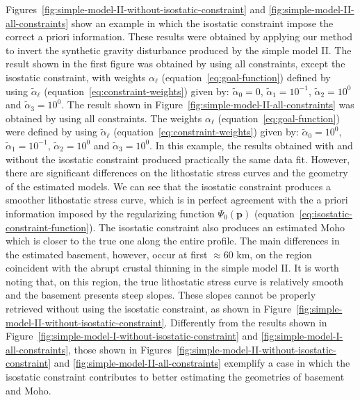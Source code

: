 \documentclass[manuscript]{geophysics}
\begin{document}
Figures~\ref{fig:simple-model-II-without-isostatic-constraint} and 
\ref{fig:simple-model-II-all-constraints}
show an example in which the isostatic constraint impose the correct
a priori information. 
These results were obtained by applying our method to invert the synthetic gravity 
disturbance produced by the simple model II.
The result shown in the first figure was obtained by using all constraints,
except the isostatic constraint, with weights $\alpha_{\ell}$ 
(equation~\ref{eq:goal-function}) defined by
using $\tilde{\alpha}_{\ell}$ (equation~\ref{eq:constraint-weights}) given by: 
$\tilde{\alpha}_{0} = 0$, $\tilde{\alpha}_{1} = 10^{-1}$, 
$\tilde{\alpha}_{2} = 10^{0}$ and $\tilde{\alpha}_{3} = 10^{0}$.
The result shown in Figure~\ref{fig:simple-model-II-all-constraints} was
obtained by using all constraints. 
The weights $\alpha_{\ell}$ (equation~\ref{eq:goal-function}) were defined by
using $\tilde{\alpha}_{\ell}$ (equation~\ref{eq:constraint-weights}) given by: 
$\tilde{\alpha}_{0} = 10^{0}$, $\tilde{\alpha}_{1} = 10^{-1}$, 
$\tilde{\alpha}_{2} = 10^{0}$ and $\tilde{\alpha}_{3} = 10^{0}$.
In this example, the results obtained with and without the isostatic 
constraint produced practically the same data fit. However, there are 
significant differences on the lithostatic stress curves and the geometry of 
the estimated models. 
We can see that the isostatic constraint produces a smoother  
lithostatic stress curve, which is in perfect agreement with the a priori information
imposed by the regularizing function $\Psi_{0}(\mathbf{p})$
(equation~\ref{eq:isostatic-constraint-function}).
The isostatic constraint also produces an estimated Moho which is closer to the
true one along the entire profile.
The main differences in the estimated basement, however, occur at
first $\approx 60$ km, on the region coincident with the abrupt crustal thinning
in the simple model II.
It is worth noting that, on this region, the true lithostatic stress curve is
relatively smooth and the basement presents steep slopes.
These slopes cannot be properly retrieved without using the isostatic
constraint, as shown in Figure~\ref{fig:simple-model-II-without-isostatic-constraint}.
Differently from the results shown in 
Figure~\ref{fig:simple-model-I-without-isostatic-constraint} and
\ref{fig:simple-model-I-all-constraints},
those shown in
Figures~\ref{fig:simple-model-II-without-isostatic-constraint} and 
\ref{fig:simple-model-II-all-constraints}
exemplify a case in which the isostatic constraint contributes to
better estimating the geometries of basement and Moho.
\end{document}
